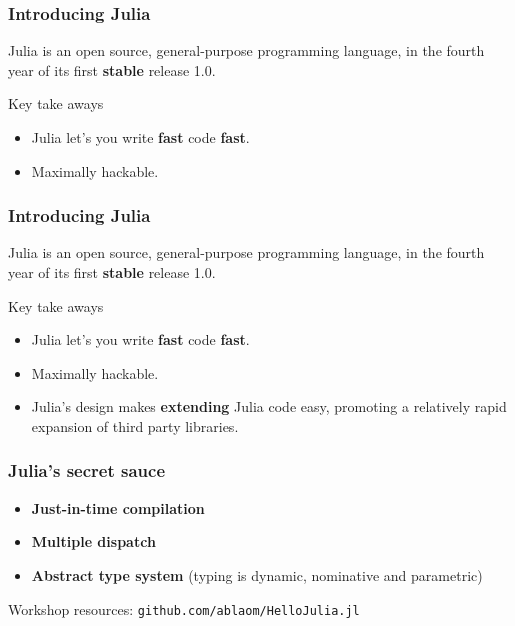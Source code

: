 \documentclass[t]{beamer}
\newcommand\df{\bf\color{Maroon}}
\begin{document}
\iffalse

\begin{frame}
  \frametitle{Introducing Julia}
  Julia is an open source, general-purpose programming language, in
  the fourth year of its first {\df stable} release 1.0.\pause

  \begin{block}{Key take aways}
    \begin{itemize}
    \item Julia let's you write {\df fast}
      code {\df fast}.\pause
    \item Maximally hackable.
  \end{itemize}
  \end{block}
\end{frame}




\begin{frame}
  \frametitle{Introducing Julia}
  Julia is an open source, general-purpose programming language, in
  the fourth year of its first {\df stable} release 1.0.

  \begin{block}{Key take aways}
    \begin{itemize}
    \item Julia let's you write {\df fast}
      code {\df fast}.
    \item Maximally hackable.
    \item Julia's design makes {\df extending} Julia code easy,
      promoting a relatively rapid expansion of third party libraries.
    \end{itemize}
  \end{block}
\end{frame}

\begin{frame}
  \frametitle{Julia's secret sauce}
    \begin{itemize}
    \item {\df Just-in-time compilation}
    \item {\df Multiple dispatch}
    \item {\df Abstract type system} (typing is dynamic, nominative and parametric)
  \end{itemize}
\end{frame}

\begin{frame}
  \begin{block}{Workshop resources:}
    {\large\texttt{github.com/ablaom/HelloJulia.jl}}
    \end{block}
\end{frame}
\end{document}
